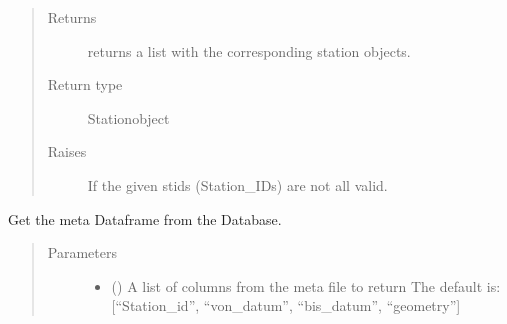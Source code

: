 \documentclass[letterpaper,10pt,english]{sphinxmanual}
\begin{document}
\begin{fulllineitems}
\begin{fulllineitems}
\begin{quote}
\begin{description}
\begin{itemize}
\end{itemize}

\item[{Returns}] \leavevmode
\sphinxAtStartPar
returns a list with the corresponding station objects.

\item[{Return type}] \leavevmode
\sphinxAtStartPar
Station\sphinxhyphen{}object

\item[{Raises}] \leavevmode
\sphinxAtStartPar
{} \textendash{} If the given stids (Station\_IDs) are not all valid.

\end{description}\end{quote}

\end{fulllineitems}


\begin{fulllineitems}
\label{\detokenize{weatherDB:weatherDB.stations.GroupStations.create_roger_ts_tempzip}}
\end{fulllineitems}


\begin{fulllineitems}
\label{\detokenize{weatherDB:weatherDB.stations.GroupStations.get_meta}}
\sphinxAtStartPar
Get the meta Dataframe from the Database.
\begin{quote}\begin{description}
\item[{Parameters}] \leavevmode\begin{itemize}
\item {} 
\sphinxAtStartPar
{} (\sphinxstyleliteralemphasis{\sphinxupquote{, }}) \textendash{} A list of columns from the meta file to return
The default is: {[}“Station\_id”, “von\_datum”, “bis\_datum”, “geometry”{]}


\end{itemize}
\end{description}
\end{quote}
\end{fulllineitems}
\end{fulllineitems}
\end{document}
